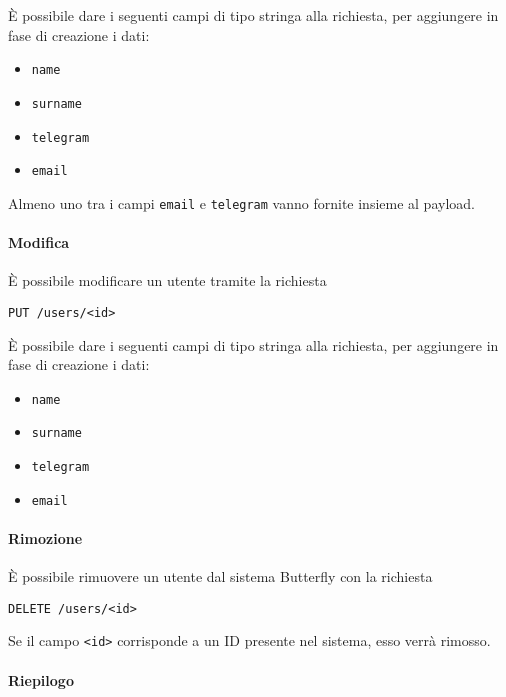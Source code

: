 È possibile dare i seguenti campi di tipo stringa alla richiesta, per aggiungere in fase di creazione
i dati:
\begin{itemize}[noitemsep]
    \item \texttt{name}
    \item \texttt{surname}
    \item \texttt{telegram}
    \item \texttt{email}
\end{itemize}
Almeno uno tra i campi \texttt{email} e \texttt{telegram} vanno fornite insieme al payload.


\paragraph{Modifica}

È possibile modificare un utente tramite la richiesta
\begin{center}
    \texttt{PUT /users/<id>}
\end{center}
È possibile dare i seguenti campi di tipo stringa alla richiesta, per aggiungere in fase di creazione
i dati:
\begin{itemize}[noitemsep]
    \item \texttt{name}
    \item \texttt{surname}
    \item \texttt{telegram}
    \item \texttt{email}
\end{itemize}


\paragraph{Rimozione}

È possibile rimuovere un utente dal sistema Butterfly con la richiesta
\begin{center}
    \texttt{DELETE /users/<id>}
\end{center}

Se il campo \texttt{<id>} corrisponde a un ID presente nel sistema, esso verrà rimosso.


\paragraph{Riepilogo}

